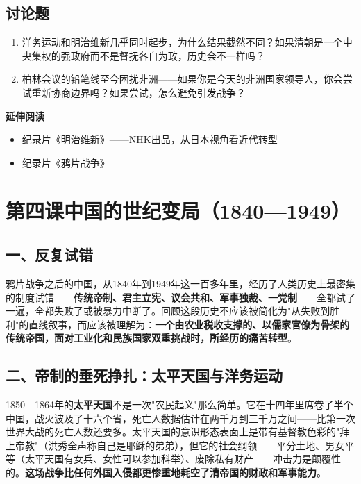 \documentclass[a4paper,12pt]{ctexart}
\begin{document}
\subsection*{讨论题}
\begin{enumerate}
  \item 洋务运动和明治维新几乎同时起步，为什么结果截然不同？如果清朝是一个中央集权的强政府而不是督抚各自为政，历史会不一样吗？
  \item 柏林会议的铅笔线至今困扰非洲——如果你是今天的非洲国家领导人，你会尝试重新协商边界吗？如果尝试，怎么避免引发战争？
\end{enumerate}

\vspace{0.3cm}
\textcolor{blue!70!black}{\textbf{延伸阅读}}
\begin{itemize}
  \item 纪录片《明治维新》——NHK出品，从日本视角看近代转型
  \item 纪录片《鸦片战争》
\end{itemize}

\newpage

\section{\textcolor{orange!80!black}{第四课\quad 中国的世纪变局（1840—1949）}}

\subsection*{一、反复试错}

鸦片战争之后的中国，从1840年到1949年这一百多年里，经历了人类历史上最密集的制度试错——\textbf{传统帝制、君主立宪、议会共和、军事独裁、一党制}——全都试了一遍，全都失败了或被暴力中断了。回顾这段历史不应该被简化为"从失败到胜利"的直线叙事，而应该被理解为：\textbf{一个由农业税收支撑的、以儒家官僚为骨架的传统帝国，面对工业化和民族国家双重挑战时，所经历的痛苦转型}。

\subsection*{二、帝制的垂死挣扎：太平天国与洋务运动}

1850—1864年的\textbf{太平天国}不是一次"农民起义"那么简单。它在十四年里席卷了半个中国，战火波及了十六个省，死亡人数据估计在两千万到三千万之间——比第一次世界大战的死亡人数还要多。太平天国的意识形态表面上是带有基督教色彩的"拜上帝教"（洪秀全声称自己是耶稣的弟弟），但它的社会纲领——平分土地、男女平等（太平天国有女兵、女性可以参加科举）、废除私有财产——冲击力是颠覆性的。\textbf{这场战争比任何外国入侵都更惨重地耗空了清帝国的财政和军事能力}。
\end{document}
